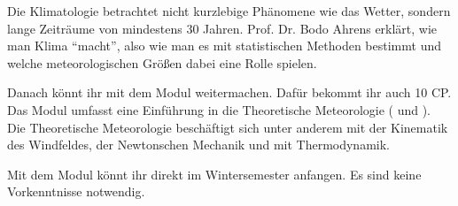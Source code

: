 \pagebreak

Die Klimatologie betrachtet nicht kurzlebige Phänomene wie das Wetter, sondern lange Zeiträume von mindestens 30 Jahren.
Prof. Dr. Bodo Ahrens erklärt, wie man Klima "`macht"', also wie man es mit statistischen Methoden bestimmt und welche meteorologischen Größen dabei eine Rolle spielen.
\bigskip

Danach könnt ihr mit dem Modul  weitermachen.
Dafür bekommt ihr auch 10 CP.
\\Das Modul umfasst eine Einführung in die Theoretische Meteorologie ( und ).
\\Die Theoretische Meteorologie beschäftigt sich unter anderem mit der Kinematik des Windfeldes, der Newtonschen Mechanik und mit Thermodynamik.
\bigskip

Mit dem Modul  könnt ihr direkt im Wintersemester anfangen.
Es sind keine Vorkenntnisse notwendig.

